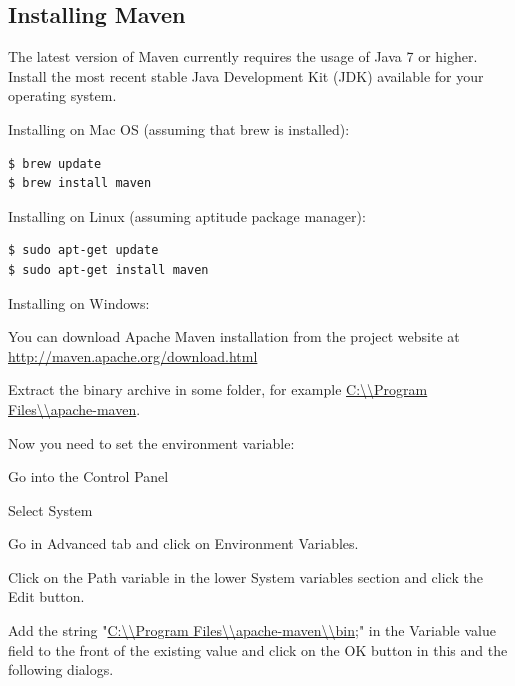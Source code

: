 \documentclass{article}
\begin{document}
\subsection{Installing Maven}

The latest version of Maven currently requires the usage of Java 7 or
higher. Install the most recent stable Java Development Kit (JDK)
available for your operating system.

\begin{description}
\item Installing on Mac OS (assuming that brew is installed):
\begin{lstlisting}
$ brew update
$ brew install maven
\end{lstlisting}

\item Installing on Linux (assuming aptitude package manager):
\begin{lstlisting}
$ sudo apt-get update
$ sudo apt-get install maven
\end{lstlisting}

\item Installing on Windows:

You can download Apache Maven installation from the project website at
\url{http://maven.apache.org/download.html}

Extract the binary archive in some folder, for example \url{C:\\Program Files\\apache-maven}.

Now you need to set the environment variable:

\begin{compactitem}

\item Go into the Control Panel
\item Select System
\item Go in Advanced tab and click on Environment Variables.
\item Click on the Path variable in the lower System variables section and click the Edit button.
\item Add the string "\url{C:\\Program Files\\apache-maven\\bin;}" in the Variable value field to the front of the existing value and click on the OK button in this and the following dialogs.

\end{compactitem}

\end{description}
\end{document}

